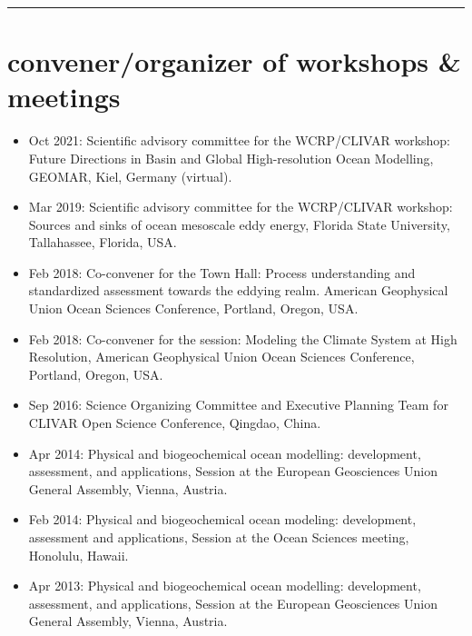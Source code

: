 

\noindent\rule{\textwidth}{1pt}
\vspace{-1cm}
\section*{\sc  \color{Maroon}  convener/organizer of workshops \& meetings}
\vspace{-.3cm}

\begin{itemize}[leftmargin=*]

\item Oct 2021: Scientific advisory committee for the WCRP/CLIVAR workshop: Future Directions in Basin and Global High-resolution Ocean Modelling, GEOMAR, Kiel, Germany (virtual).

\item Mar 2019: Scientific advisory committee for the WCRP/CLIVAR workshop: Sources and sinks of ocean mesoscale eddy energy, Florida State University, Tallahassee, Florida, USA. 

\item Feb 2018: Co-convener for the Town Hall: Process understanding and standardized assessment towards the eddying realm. {\sc American Geophysical Union Ocean Sciences Conference}, Portland, Oregon, USA.

\item Feb 2018: Co-convener for the session: Modeling the Climate System at High Resolution, {\sc American Geophysical Union Ocean Sciences Conference}, Portland, Oregon, USA.

\item Sep 2016: Science Organizing Committee and Executive Planning Team for {\sc CLIVAR Open Science Conference}, Qingdao, China.

\item Apr 2014: {\sc Physical and biogeochemical ocean modelling: development, assessment, and applications}, Session at the European Geosciences Union General Assembly, Vienna, Austria.

\item Feb 2014: {\sc Physical and biogeochemical ocean modeling: development, assessment and applications}, Session at the Ocean Sciences meeting, Honolulu, Hawaii.

\item Apr 2013: {\sc Physical and biogeochemical ocean modelling: development, assessment, and applications}, Session at the European Geosciences Union General Assembly, Vienna, Austria.


\end{itemize}
